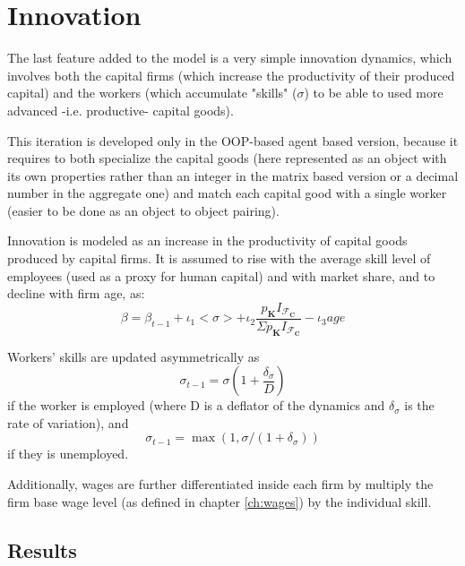 \chapter{Innovation}
\label{ch:m6}
The last feature added to the model is a very simple innovation dynamics, which involves both the capital firms (which increase the productivity of their produced capital) and the workers (which accumulate "skills" ($\sigma$) to be able to used more advanced -i.e. productive- capital goods).

This iteration is developed only in the OOP-based agent based version, because it requires to both specialize the capital goods (here represented as an object with its own properties rather than an integer in the matrix based version or a decimal number in the aggregate one) and match each capital good with a single worker (easier to be done as an object to object pairing).

Innovation is modeled as an increase in the productivity of capital goods produced by capital firms. It is assumed to rise with the average skill level of employees (used as a proxy for human capital) and with market share, and to decline with firm age, as:
$$\beta = \beta_{t-1} + \iota_1 <\sigma> + \iota_2 \frac{p_\mathbf{K}I_{\mathcal{F}_\mathbf{C}}}{\Sigma p_\mathbf{K}I_{\mathcal{F}_\mathbf{C}}} - \iota_3 age$$

Workers' skills are updated asymmetrically as 
$$\sigma_{t-1} = \sigma (1+\frac{\delta_\sigma}{D})$$
if the worker is employed (where D is a deflator of the dynamics and $\delta_\sigma$ is the rate of variation), and
$$\sigma_{t-1} = \max(1,\sigma / (1+\delta_\sigma))$$ if they is unemployed.

Additionally, wages are further differentiated inside each firm by multiply the firm base wage level (as defined in chapter \ref{ch:wages}) by the individual skill.

\section{Results}


